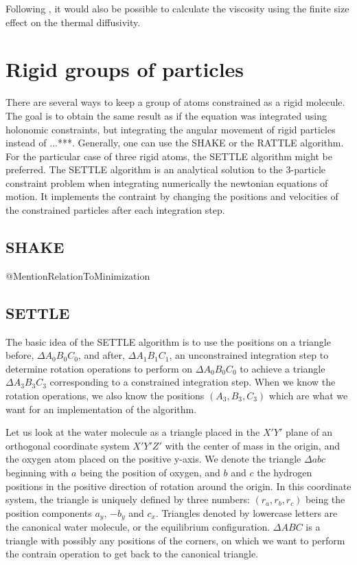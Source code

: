 Following \cite{Yeh2004}, it would also be possible to calculate the viscosity using the finite size effect on the thermal diffusivity.


\section{Rigid groups of particles}
There are several ways to keep a group of atoms constrained as a rigid molecule. The goal is to obtain the same result as if the equation was integrated using holonomic constraints, but integrating the angular movement of rigid particles instead of ...***. Generally, one can use the SHAKE or the RATTLE algorithm. For the particular case of three rigid atoms, the SETTLE algorithm might be preferred. The SETTLE algorithm \cite{Miyamoto1992} is an analytical solution to the 3-particle constraint problem when integrating numerically the newtonian equations of motion. It implements the contraint by changing the positions and velocities of the constrained particles after each integration step.

\subsection{SHAKE}
\label{sec:shake}
@MentionRelationToMinimization

\subsection{SETTLE}
The basic idea of the SETTLE algorithm is to use the positions on a triangle before, $\Delta A_0 B_0 C_0$, and after, $\Delta A_1 B_1 C_1$, an unconstrained integration step to determine rotation operations to perform on $\Delta A_0 B_0 C_0$ to achieve a triangle $\Delta A_3 B_3 C_3$ corresponding to a constrained integration step. When we know the rotation operations, we also know the positions $(A_3, B_3, C_3)$ which are what we want for an implementation of the algorithm.

Let us look at the water molecule as a triangle placed in the $X'Y'$ plane of an orthogonal coordinate system $X'Y'Z'$	with the center of mass in the origin, and the oxygen atom placed on the positive y-axis. We denote the triangle $\Delta abc$ beginning with $a$ being the position of oxygen, and $b$ and $c$ the hydrogen positions in the positive direction of rotation around the origin.  In this coordinate system, the triangle is uniquely defined by three numbers: $(r_a, r_b, r_c)$ being the position components $a_y$, $-b_y$ and $c_x$. Triangles denoted by lowercase letters are the canonical water molecule, or the equilibrium configuration. $\Delta ABC$ is a triangle with possibly any positions of the corners, on which we want to perform the contrain operation to get back to the canonical triangle. 

